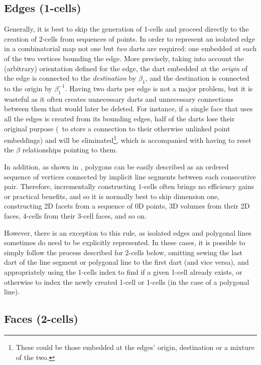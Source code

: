 \subsection{Edges (1-cells)}
\label{ss:incremental-edges}

Generally, it is best to skip the generation of 1-cells and proceed directly to the creation of 2-cells from sequences of points.
In order to represent an isolated edge in a combinatorial map not one but \emph{two} darts are required: one embedded at each of the two vertices bounding the edge.
More precisely, taking into account the (arbitrary) orientation defined for the edge, the dart embedded at the \emph{origin} of the edge is connected to the \emph{destination} by $\beta_1$, and the destination is connected to the origin by $\beta_1^{-1}$.
Having two darts per edge is not a major problem, but it is wasteful as it often creates unnecessary darts and unnecessary connections between them that would later be deleted.
For instance, if a single face that uses all the edges is created from its bounding edges, half of the darts lose their original purpose (\ie\ to store a connection to their otherwise unlinked point embeddings) and will be eliminated\footnote{These could be those embedded at the edges' origin, destination or a mixture of the two.}, which is accompanied with having to reset the $\beta$ relationships pointing to them.

In addition, as shown in , polygons can be easily described as an ordered sequence of vertices connected by implicit line segments between each consecutive pair.
Therefore, incrementally constructing $1$-cells often brings no efficiency gains or practical benefits, and so it is normally best to skip dimension one, constructing 2D facets from a sequence of 0D points, 3D volumes from their 2D faces, 4-cells from their 3-cell faces, and so on.

However, there is an exception to this rule, as isolated edges and polygonal lines sometimes do need to be explicitly represented.
In these cases, it is possible to simply follow the process described for 2-cells below, omitting sewing the last dart of the line segment or polygonal line to the first dart (and vice versa), and appropriately using the 1-cells index to find if a given 1-cell already exists, or otherwise to index the newly created 1-cell or 1-cells (in the case of a polygonal line).

\subsection{Faces (2-cells)}
\label{ss:incremental-faces}

